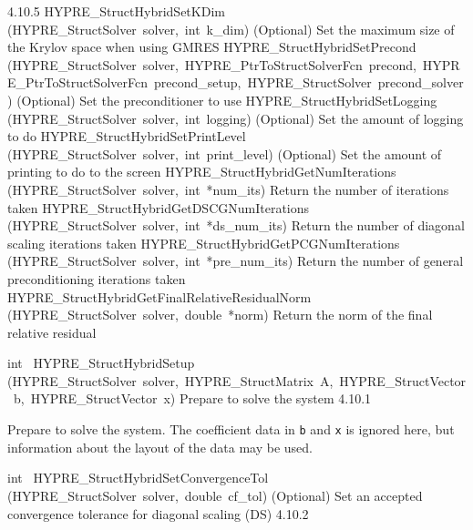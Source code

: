 \documentclass{article}
\begin{document}
\begin{cxxentry}
\begin{cxxentry}
\begin{cxxnames}
        {4.10.5}
        {HYPRE\_StructHybridSetKDim}
        {(HYPRE\_StructSolver\ solver,\ int\ k\_dim)}
        {
(Optional) Set the maximum size of the Krylov space when using GMRES}
        {}
\label{cxx.4.10.12}
        {HYPRE\_StructHybridSetPrecond}
        {(HYPRE\_StructSolver\ solver,\ HYPRE\_PtrToStructSolverFcn\ precond,\ HYPRE\_PtrToStructSolverFcn\ precond\_setup,\ HYPRE\_StructSolver\ precond\_solver)}
        {
(Optional) Set the preconditioner to use}
        {}
\label{cxx.4.10.13}
        {HYPRE\_StructHybridSetLogging}
        {(HYPRE\_StructSolver\ solver,\ int\ logging)}
        {
(Optional) Set the amount of logging to do}
        {}
\label{cxx.4.10.14}
        {HYPRE\_StructHybridSetPrintLevel}
        {(HYPRE\_StructSolver\ solver,\ int\ print\_level)}
        {
(Optional) Set the amount of printing to do to the screen}
        {}
\label{cxx.4.10.15}
        {HYPRE\_StructHybridGetNumIterations}
        {(HYPRE\_StructSolver\ solver,\ int\ *num\_its)}
        {
Return the number of iterations taken}
        {}
\label{cxx.4.10.16}
        {HYPRE\_StructHybridGetDSCGNumIterations}
        {(HYPRE\_StructSolver\ solver,\ int\ *ds\_num\_its)}
        {
Return the number of diagonal scaling iterations taken}
        {}
\label{cxx.4.10.17}
        {HYPRE\_StructHybridGetPCGNumIterations}
        {(HYPRE\_StructSolver\ solver,\ int\ *pre\_num\_its)}
        {
Return the number of general preconditioning iterations taken}
        {}
\label{cxx.4.10.18}
        {HYPRE\_StructHybridGetFinalRelativeResidualNorm}
        {(HYPRE\_StructSolver\ solver,\ double\ *norm)}
        {
Return the norm of the final relative residual}
        {}
\label{cxx.4.10.19}
\end{cxxnames}
\begin{cxxfunction}
{int\ }
        {HYPRE\_StructHybridSetup}
        {(HYPRE\_StructSolver\ solver,\ HYPRE\_StructMatrix\ A,\ HYPRE\_StructVector\ b,\ HYPRE\_StructVector\ x)}
        {
Prepare to solve the system}
        {4.10.1}
\begin{cxxdoc}

Prepare to solve the system.  The coefficient data in {\tt b} and {\tt x} is
ignored here, but information about the layout of the data may be used.
\end{cxxdoc}
\end{cxxfunction}
\begin{cxxfunction}
{int\ }
        {HYPRE\_StructHybridSetConvergenceTol}
        {(HYPRE\_StructSolver\ solver,\ double\ cf\_tol)}
        {
(Optional) Set an accepted convergence tolerance for diagonal scaling (DS)}
        {4.10.2}
\begin{cxxdoc}


\end{cxxdoc}
\end{cxxfunction}
\end{cxxentry}
\end{cxxentry}
\end{document}
